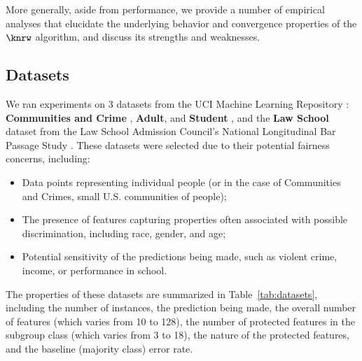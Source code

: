 More generally, aside from performance, we provide a number of empirical analyses that elucidate
	the underlying behavior and convergence properties of the $\knrw$ algorithm, and discuss its strengths and
	weaknesses.

\subsection{Datasets}

We ran experiments on $3$ datasets from the UCI Machine Learning
Repository \cite{UCI}:
\textbf{Communities and Crime} \citep{communities},
\textbf{Adult},
and \textbf{Student} \citep{student}, and the \textbf{Law School} dataset from the Law School Admission Council's National Longitudinal Bar Passage Study \citep{lawschool}.
These datasets were selected due to their potential fairness concerns, including:
\begin{itemize}
\item Data points representing individual people (or in the case of Communities and Crimes,
	small U.S. communities of people);
\item The presence of features capturing properties often associated with possible
	discrimination, including race, gender, and age;
\item Potential sensitivity of the predictions being made, such as violent crime,
	income, or performance in school.
\end{itemize}

The properties of these datasets are summarized in Table~\ref{tab:datasets},
including the number of instances, the prediction being made, the overall number of
features (which varies from 10 to 128),
the number of protected features in the subgroup class (which varies from 3 to 18),
the nature of the protected
features, and the baseline (majority class) error rate.

